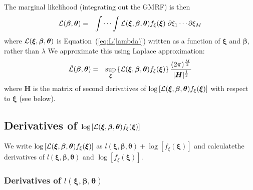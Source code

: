 \documentclass[a4paper]{article}
\begin{document}
The marginal likelihood (integrating out the GMRF) is then
\begin{eqnarray}
{\cal L}(\boldsymbol{\beta},\boldsymbol{\theta})
&=&
\int\cdots\int {\cal L}(\boldsymbol{\xi},\boldsymbol{\beta},\boldsymbol{\theta})
f_\xi(\boldsymbol{\xi})\;\partial\xi_1\cdots\partial\xi_M
\end{eqnarray}
\noindent
where ${\cal L}(\boldsymbol{\xi},\boldsymbol{\beta},\boldsymbol{\theta})$ is Equation~(\ref{eq:L(lambda)}) written as a function of $\boldsymbol{\xi}$ and $\boldsymbol{\beta},$ rather than $\lambda$
We approximate this using Laplace approximation:
\begin{eqnarray}
\tilde{{\cal L}}(\boldsymbol{\beta},\boldsymbol{\theta})&=&\sup_{\boldsymbol{\xi}}\left\{{\cal L}(\boldsymbol{\xi},\boldsymbol{\beta},\boldsymbol{\theta})f_\xi(\boldsymbol{\xi})\right\}\frac{(2\pi)^{\frac{M}{2}}}{|\boldsymbol{H}|^{\frac{1}{2}}}
\end{eqnarray}
\noindent
where $\boldsymbol{H}$ is the matrix of second derivatives of $\log\left[{\cal L}(\boldsymbol{\xi},\boldsymbol{\beta},\boldsymbol{\theta})f_\xi(\boldsymbol{\xi})\right]$ with respect to $\boldsymbol{\xi}$ (see below).

\subsection{Derivatives of $\log\left[{\cal L}(\boldsymbol{\xi},\boldsymbol{\beta},\boldsymbol{\theta})f_\xi(\boldsymbol{\xi})\right]$}

We write $\log\left[{\cal L}(\boldsymbol{\xi},\boldsymbol{\beta},\boldsymbol{\theta})f_\xi(\boldsymbol{\xi})\right]$ as $l(\boldsymbol{\xi},\boldsymbol{\beta},\boldsymbol{\theta})+\log\left[f_\xi(\boldsymbol{\xi})\right]$ and calculatethe derivatives of $l(\boldsymbol{\xi},\boldsymbol{\beta},\boldsymbol{\theta})$ and $\log\left[f_\xi(\boldsymbol{\xi})\right]$.

\subsubsection{Derivatives of $l(\boldsymbol{\xi},\boldsymbol{\beta},\boldsymbol{\theta})$}
\end{document}
